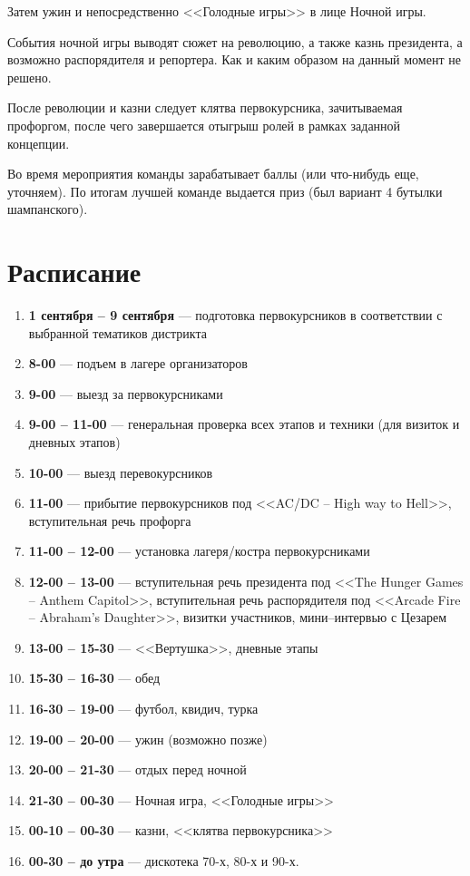 \documentclass[a4paper, 14pt]{extarticle}
\theoremstyle{definition}
\begin{document}
\par Затем ужин и непосредственно <<Голодные игры>> в лице Ночной игры.

\par События ночной игры выводят сюжет на революцию, а также казнь президента, а возможно распорядителя и репортера. Как и каким образом на данный момент не решено.

\par После революции и казни следует клятва первокурсника, зачитываемая профоргом, после чего завершается отыгрыш ролей в рамках заданной концепции.

\par Во время мероприятия команды зарабатывает баллы (или что-нибудь еще, уточняем). По итогам лучшей команде выдается приз (был вариант 4 бутылки шампанского).


\section{Расписание}

\begin{enumerate}
\item \textbf{1 сентября -- 9 сентября} --- подготовка первокурсников в соответствии с выбранной тематиков дистрикта
\item \textbf{8-00} --- подъем в лагере организаторов
\item \textbf{9-00} --- выезд за первокурсниками
\item \textbf{9-00 -- 11-00} --- генеральная проверка всех этапов и техники (для визиток и дневных этапов)
\item \textbf{10-00} --- выезд перевокурсников
\item \textbf{11-00} --- прибытие первокурсников под <<AC/DC -- High way to Hell>>, вступительная речь профорга
\item \textbf{11-00 -- 12-00} --- установка лагеря/костра первокурсниками
\item \textbf{12-00 -- 13-00} --- вступительная речь президента под <<The Hunger Games -- Anthem Capitol>>, вступительная речь распорядителя под <<Arcade Fire -- Abraham's Daughter>>, визитки участников, мини--интервью с Цезарем
\item \textbf{13-00 -- 15-30} --- <<Вертушка>>, дневные этапы
\item \textbf{15-30 -- 16-30} --- обед
\item \textbf{16-30 -- 19-00} --- футбол, квидич, турка
\item \textbf{19-00 -- 20-00} --- ужин (возможно позже)
\item \textbf{20-00 -- 21-30} --- отдых перед ночной
\item \textbf{21-30 -- 00-30} --- Ночная игра, <<Голодные игры>>
\item \textbf{00-10 -- 00-30} --- казни, <<клятва первокурсника>>
\item \textbf{00-30 -- до утра} --- дискотека 70-х, 80-х и 90-х.
\end{enumerate}
\end{document}
